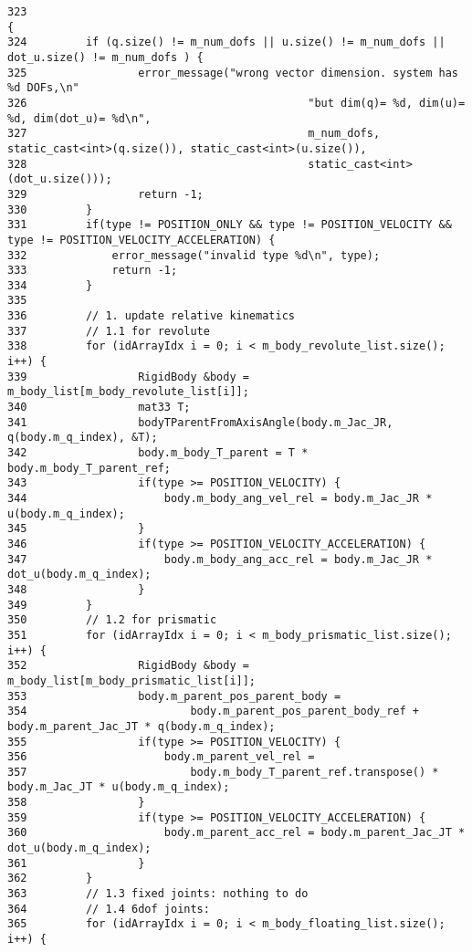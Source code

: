 \begin{Code}\begin{verbatim}323                                                                                 {
324         if (q.size() != m_num_dofs || u.size() != m_num_dofs || dot_u.size() != m_num_dofs ) {
325                 error_message("wrong vector dimension. system has %d DOFs,\n"
326                                           "but dim(q)= %d, dim(u)= %d, dim(dot_u)= %d\n",
327                                           m_num_dofs, static_cast<int>(q.size()), static_cast<int>(u.size()),
328                                           static_cast<int>(dot_u.size()));
329                 return -1;
330         }
331         if(type != POSITION_ONLY && type != POSITION_VELOCITY && type != POSITION_VELOCITY_ACCELERATION) {
332             error_message("invalid type %d\n", type);
333             return -1;
334         }
335 
336         // 1. update relative kinematics
337         // 1.1 for revolute
338         for (idArrayIdx i = 0; i < m_body_revolute_list.size(); i++) {
339                 RigidBody &body = m_body_list[m_body_revolute_list[i]];
340                 mat33 T;
341                 bodyTParentFromAxisAngle(body.m_Jac_JR, q(body.m_q_index), &T);
342                 body.m_body_T_parent = T * body.m_body_T_parent_ref;
343                 if(type >= POSITION_VELOCITY) {
344                     body.m_body_ang_vel_rel = body.m_Jac_JR * u(body.m_q_index);
345                 }
346                 if(type >= POSITION_VELOCITY_ACCELERATION) {
347                     body.m_body_ang_acc_rel = body.m_Jac_JR * dot_u(body.m_q_index);
348                 }
349         }
350         // 1.2 for prismatic
351         for (idArrayIdx i = 0; i < m_body_prismatic_list.size(); i++) {
352                 RigidBody &body = m_body_list[m_body_prismatic_list[i]];
353                 body.m_parent_pos_parent_body =
354                         body.m_parent_pos_parent_body_ref + body.m_parent_Jac_JT * q(body.m_q_index);
355                 if(type >= POSITION_VELOCITY) {
356                     body.m_parent_vel_rel =
357                         body.m_body_T_parent_ref.transpose() * body.m_Jac_JT * u(body.m_q_index);
358                 }
359                 if(type >= POSITION_VELOCITY_ACCELERATION) {
360                     body.m_parent_acc_rel = body.m_parent_Jac_JT * dot_u(body.m_q_index);
361                 }
362         }
363         // 1.3 fixed joints: nothing to do
364         // 1.4 6dof joints:
365         for (idArrayIdx i = 0; i < m_body_floating_list.size(); i++) {

\end{verbatim}
\end{Code}
